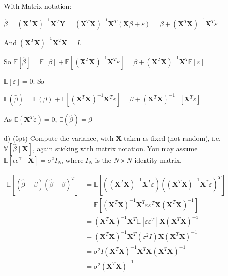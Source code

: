 \documentclass{article}\usepackage[]{graphicx}\usepackage[]{color}
\begin{document}
With Matrix notation: 

$\hat{\beta}=\left(\mathbf{X}^{T} \mathbf{X}\right)^{-1} \mathbf{X}^{T} \mathbf{Y} =\left(\mathbf{X}^{T} \mathbf{X}\right)^{-1} \mathbf{X}^{T}(\mathbf{X} \beta+\varepsilon) =\beta+\left(\mathbf{X}^{T} \mathbf{X}\right)^{-1} \mathbf{X}^{T} \varepsilon$ 

And $\left(\mathbf{X}^{T} \mathbf{X}\right)^{-1} \mathbf{X}^{T} \mathbf{X}=I$. 

So 
$\mathbb{E}[\hat{\beta}] =\mathbb{E}[\beta]+\mathbb{E}\left[\left(\mathbf{X}^{T} \mathbf{X}\right)^{-1} \mathbf{X}^{T} \varepsilon\right] 
=\beta+\left(\mathbf{X}^{T} \mathbf{X}\right)^{-1} \mathbf{X}^{T} \mathbb{E}[\varepsilon]$


$\mathbb{E}[\varepsilon]=0$. So


$
\mathbb{E}(\hat{\beta}) 
=\mathbb{E}(\beta)+\mathbb{E}\left[\left(\mathbf{X}^{T} \mathbf{X} \right)^{-1} \mathbf{X}^{T} \varepsilon \right] 
=\beta+\left(\mathbf{X}^{T} \mathbf{X}\right)^{-1} \mathbb{E}\left[\mathbf{X}^{T} \varepsilon\right]
$


As $\mathbb{E}\left(\mathbf{X}^{T} \varepsilon\right)=0$, $\mathbb{E}(\hat{\beta})  = \beta$
\vspace*{0.5cm}


d) (5pt) Compute the variance, with $\mathbf{X}$ taken as fixed (not random), i.e. $\mathbb{V}[\hat{\beta} \mid \mathbf{X}]$, again sticking with matrix notation. You may assume $\mathbb{E}\left[\epsilon \epsilon^{\top} \mid \mathbf{X}\right]=\sigma^{2} I_{N}$, where $I_{N}$ is the $N \times N$ identity matrix.

\vspace*{0.5cm}
$
\begin{aligned}
\mathbb{E}\left[(\hat{\beta}-\beta)(\hat{\beta}-\beta)^{T}\right]  &=\mathbb{E}\left[\left(\left(\mathbf{X}^{T} \mathbf{X}\right)^{-1} \mathbf{X}^{T} \varepsilon\right)\left(\left(\mathbf{X}^{T} \mathbf{X}\right)^{-1} \mathbf{X}^{T} \varepsilon\right)^{T}\right]  \\ &=\mathbb{E}\left[\left(\mathbf{X}^{T} \mathbf{X}\right)^{-1} \mathbf{X}^{T} \varepsilon \varepsilon^{T} \mathbf{X}\left(\mathbf{X}^{T} \mathbf{X}\right)^{-1}\right] \\
&= \left(\mathbf{X}^{T} \mathbf{X}\right)^{-1} \mathbf{X}^{T} \mathbb{E}\left[\varepsilon \varepsilon ^{T}\right] \mathbf{X}\left(\mathbf{X}^{T} \mathbf{X}\right)^{-1} \\
&=\left(\mathbf{X}^{T} \mathbf{X}\right)^{-1} \mathbf{X}^{T}\left(\sigma^{2} I\right) \mathbf{X}\left(\mathbf{X}^{T} \mathbf{X}\right)^{-1} \\
&=\sigma^{2} I\left(\mathbf{X}^{T} \mathbf{X}\right)^{-1} \mathbf{X}^{T} \mathbf{X}\left(\mathbf{X}^{T} \mathbf{X}\right)^{-1}  \\
&=\sigma^{2}\left(\mathbf{X}^{T} \mathbf{X}\right)^{-1}
\end{aligned}
$
\end{document}
